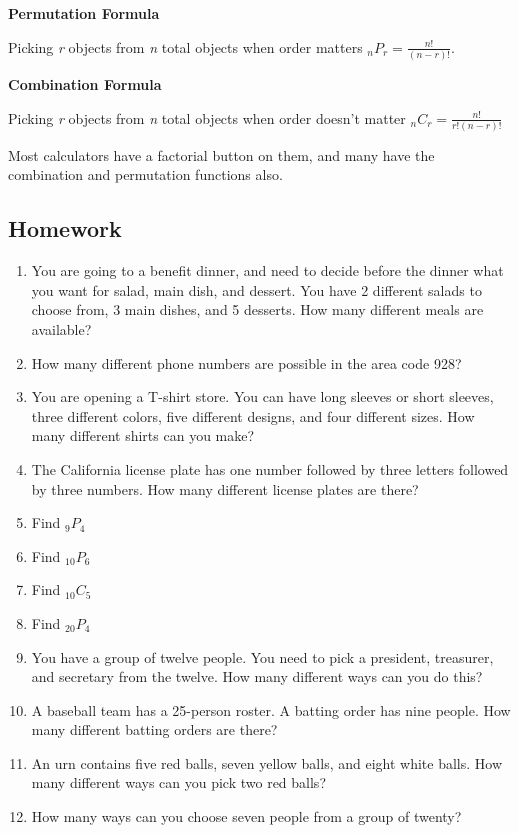 \documentclass[
]{book}
\begin{document}
\textbf{Permutation Formula}

Picking \emph{r} objects from \emph{n} total objects when order matters \(_{n}P_{r}=\frac{n!}{(n-r)!}\).

\textbf{Combination Formula}

Picking \emph{r} objects from \emph{n} total objects when order doesn't matter \(_{n}C_{r}=\frac{n!}{r!(n-r)!}\)

Most calculators have a factorial button on them, and many have the combination and permutation functions also.

\hypertarget{homework-9}{%
\subsection{Homework}\label{homework-9}}

\begin{enumerate}
\def\labelenumi{\arabic{enumi}.}
\item
  You are going to a benefit dinner, and need to decide before the dinner what you want for salad, main dish, and dessert. You have 2 different salads to choose from, 3 main dishes, and 5 desserts. How many different meals are available?
\item
  How many different phone numbers are possible in the area code 928?
\item
  You are opening a T-shirt store. You can have long sleeves or short sleeves, three different colors, five different designs, and four different sizes. How many different shirts can you make?
\item
  The California license plate has one number followed by three letters followed by three numbers. How many different license plates are there?
\item
  Find \(_9P_4\)
\item
  Find \(_{10}P_6\)
\item
  Find \(_{10}C_5\)
\item
  Find \(_{20}P_4\)
\item
  You have a group of twelve people. You need to pick a president, treasurer, and secretary from the twelve. How many different ways can you do this?
\item
  A baseball team has a 25-person roster. A batting order has nine people. How many different batting orders are there?
\item
  An urn contains five red balls, seven yellow balls, and eight white balls. How many different ways can you pick two red balls?
\item
  How many ways can you choose seven people from a group of twenty?
\end{enumerate}
\end{document}
